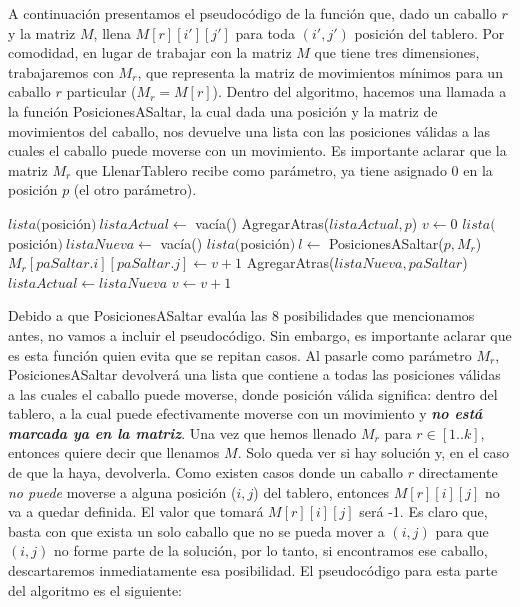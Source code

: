 \documentclass[a4paper]{article}
\begin{document}
\noindent A continuación presentamos el pseudocódigo de la función que, dado un caballo $r$ y la matriz $M$, llena $M[r][i'][j']$ para toda $(i', j')$ posición del tablero. Por comodidad, en lugar de trabajar con la matriz $M$ que tiene tres dimensiones, trabajaremos con $M_r$, que representa la matriz de movimientos mínimos para un caballo $r$ particular ($M_r = M[r]$). Dentro del algoritmo, hacemos una llamada a la función PosicionesASaltar, la cual dada una posición y la matriz de movimientos del caballo, nos devuelve una lista con las posiciones válidas a las cuales el caballo puede moverse con un movimiento.
\newline Es importante aclarar que la matriz $M_r$ que LlenarTablero recibe como parámetro, ya tiene asignado 0 en la posición $p$ (el otro parámetro).

\newpage
\begin{algorithmic}[1]
	\State $lista($posición$) \ listaActual \gets$ vacía()
	\State AgregarAtras($listaActual, p$)
	\State $v \gets 0$
	\newline
		\State $lista($posición$) \ listaNueva \gets$ vacía()
		\newline
			\State $lista($posición$) \ l \gets$ PosicionesASaltar($p, M_r$)
			\newline
				\State $M_r[paSaltar.i][paSaltar.j] \gets v + 1$
				\State AgregarAtras($listaNueva, paSaltar$)
			\EndFor
			\newline
		\EndFor
		\newline
		\State $listaActual \gets listaNueva$
		\State $v \gets v + 1$
	\EndWhile
	\newline
\EndProcedure
\end{algorithmic}
\vspace{0.5cm}
Debido a que PosicionesASaltar evalúa las 8 posibilidades que mencionamos antes, no vamos a incluir el pseudocódigo. Sin embargo, es importante aclarar que es esta función quien evita que se repitan casos. Al pasarle como parámetro $M_r$, PosicionesASaltar devolverá una lista que contiene a todas las posiciones válidas a las cuales el caballo puede moverse, donde posición válida significa: dentro del tablero, a la cual puede efectivamente moverse con un movimiento y \textit{\textbf{no está marcada ya en la matriz}}.
\newline Una vez que hemos llenado $M_r$ para $r \in [1..k]$, entonces quiere decir que llenamos $M$. Solo queda ver si hay solución y, en el caso de que la haya, devolverla. Como existen casos donde un caballo $r$ directamente \textit{no puede} moverse a alguna posición ($i, j$) del tablero, entonces $M[r][i][j]$ no va a quedar definida. El valor que tomará $M[r][i][j]$ será -1. Es claro que, basta con que exista un solo caballo que no se pueda mover a $(i, j)$ para que $(i, j)$ no forme parte de la solución, por lo tanto, si encontramos ese caballo, descartaremos inmediatamente esa posibilidad.
\newline El pseudocódigo para esta parte del algoritmo es el siguiente:
\vspace{0.4cm}
\end{document}
